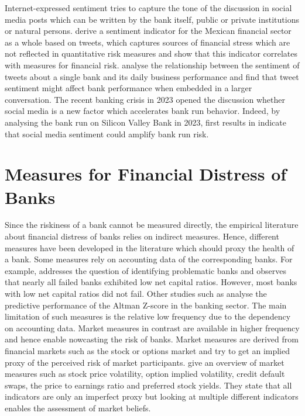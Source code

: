  Internet-expressed sentiment tries to capture the tone of the discussion in social media posts which can be written by the bank itself, public or private institutions or natural persons. \cite{fernandez2021} derive a sentiment indicator for the Mexican financial sector as a whole based on tweets, which captures sources of financial stress which are not reflected in quantitative risk measures and show that this indicator correlates with measures for financial risk. \cite{illia2021} analyse the relationship between the sentiment of tweets about a single bank and its daily business performance and find that tweet sentiment might affect bank performance when embedded in a larger conversation. The recent banking crisis in 2023 opened the discussion whether social media is a new factor which accelerates bank run behavior. Indeed, by analysing the bank run on Silicon Valley Bank in 2023, first results in \cite{cookson2023} indicate that social media sentiment could amplify bank run risk.

\section{Measures for Financial Distress of Banks}

Since the riskiness of a bank cannot be measured directly, the empirical literature about financial distress of banks relies on indirect measures. Hence, different measures have been developed in the literature which should proxy the health of a bank. Some measures rely on accounting data of the corresponding banks. For example, \cite{sinkey1978} addresses the question of identifying problematic banks and observes that nearly all failed banks exhibited low net capital ratios. However, most banks with low net capital ratios did not fail. Other studies such as \cite{chiaramonte2016} analyse the predictive performance of the Altman Z-score in the banking sector. The main limitation of such measures is the relative low frequency due to the dependency on accounting data. Market measures in contrast are available in higher frequency and hence enable nowcasting the risk of banks. Market measures are derived from financial markets such as the stock or options market and try to get an implied proxy of the perceived risk of market participants. \cite{sarin2016} give an overview of market measures such as stock price volatility, option implied volatility, credit default swaps, the price to earnings ratio and preferred stock yields. They state that all indicators are only an imperfect proxy but looking at multiple different indicators enables the assessment of market beliefs.

